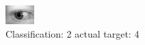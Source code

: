 \begin{figure}[h!]
\begin{center}
\includegraphics[width=0.60\columnwidth]{figures/ID827_class_2_target_4.png}
\end{center}
\caption{ Classification: 2 actual target: 4}
\label{fig:ID827_class_2_target_4}
\end{figure}

